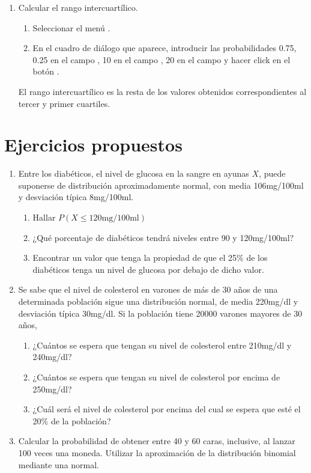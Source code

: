 \begin{enumerate}[leftmargin=*]
\begin{enumerate}
\item Calcular el rango intercuartílico.
\begin{indicacion}
\begin{enumerate}
\item Seleccionar el menú .
\item En el cuadro de diálogo que aparece, introducir las probabilidades 0.75, 0.25 en el campo ,
10 en el campo , 20  en el campo  y
hacer click en el botón .
\end{enumerate}
El rango intercuartílico es la resta de los valores obtenidos correspondientes al tercer y primer cuartiles.
\end{indicacion}
\end{enumerate}

\end{enumerate}


\section{Ejercicios propuestos}
\begin{enumerate}[leftmargin=*]
\item Entre los diabéticos, el nivel de glucosa en la sangre en ayunas $X$, puede suponerse de distribución
aproximadamente normal, con media 106mg/100ml y desviación típica 8mg/100ml.
\begin{enumerate}
\item Hallar $P(X\leq120\textrm{mg}/100\textrm{ml})$
\item ¿Qué porcentaje de diabéticos tendrá niveles entre 90 y 120mg/100ml?
\item Encontrar un valor que tenga la propiedad de que el 25\% de los diabéticos tenga un nivel de glucosa por debajo de
dicho valor.
\end{enumerate}

\item Se sabe que el nivel de colesterol en varones de más de 30 años de una determinada población sigue una
distribución normal, de media 220mg/dl y desviación típica 30mg/dl.
Si la población tiene 20000 varones mayores de 30 años,
\begin{enumerate}
\item ¿Cuántos se espera que tengan su nivel de colesterol entre 210mg/dl y 240mg/dl?
\item ¿Cuántos se espera que tengan su nivel de colesterol por encima de 250mg/dl?
\item ¿Cuál será el nivel de colesterol por encima del cual se espera que esté el 20\% de la población?
\end{enumerate}

\item Calcular la probabilidad de obtener entre 40 y 60 caras, inclusive, al lanzar 100 veces una moneda. 
Utilizar la aproximación de la distribución binomial mediante una normal.
\end{enumerate}
